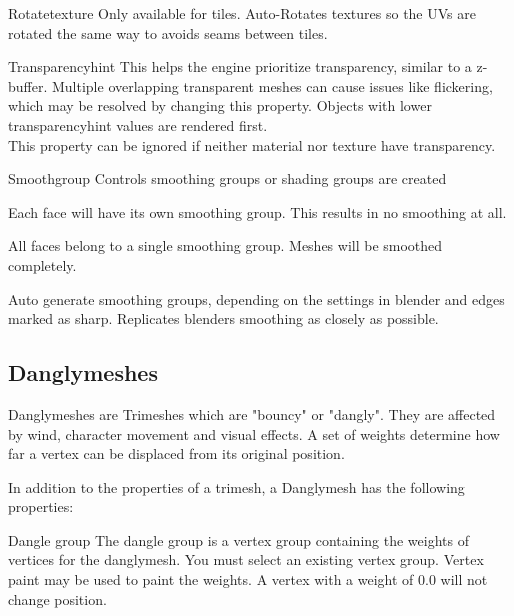 \begin{property}{Rotatetexture}
Only available for tiles. Auto-Rotates textures so the UVs are rotated
the same way to avoids seams between tiles.
\end{property}

\begin{property}{Transparencyhint}
This helps the engine prioritize transparency, similar to a z-buffer.
Multiple overlapping transparent meshes can cause issues like
flickering, which may be resolved by changing this property. Objects 
with lower transparencyhint values are rendered first.\\

This property can be ignored if neither material nor texture have transparency.
\end{property}

\begin{property}{Smoothgroup}
Controls smoothing groups or shading groups are created
\begin{description}[leftmargin=6em,style=nextline]
    \item[Separate] Each face will have its own smoothing group. This results in no smoothing at all.
    \item[Single] All faces belong to a single smoothing group. Meshes will be smoothed completely.
    \item[Auto] Auto generate smoothing groups, depending on the settings in blender and edges marked as sharp. Replicates blenders smoothing as closely as possible.
\end{description}
\end{property}

\subsection{Danglymeshes}
Danglymeshes are Trimeshes which are "bouncy" or "dangly". They are affected by
wind, character movement and visual effects. A set of weights determine how far a 
vertex can be displaced from its original position.

In addition to the properties of a trimesh, a Danglymesh has the following 
properties:

\begin{property}{Dangle group} 
The dangle group is a vertex group containing the weights of vertices for the danglymesh. 
You must select an existing vertex group. Vertex paint may be used to paint the weights. A vertex with a weight of
0.0 will not change position.
\end{property}


